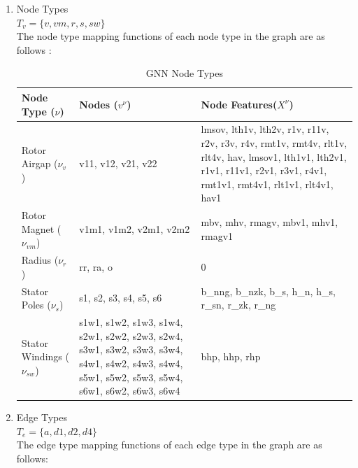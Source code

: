 \documentclass{report} %
\begin{document}
\begin{enumerate}
    \item Node Types \\
    \( T_v = \{ v, vm, r, s, sw\} \) \\
    The node type mapping functions of each node type in the graph are as follows :

    \begin{table}[H]
        \centering
        \begin{tabular}{|p{}|p{}|p{}|}
        \hline 
        {\bf Node Type (\(\nu\))} & {\bf Nodes (\( v^{\nu} \))} & {\bf Node Features(\( X^{\nu}\))}  \\
        \hline
        Rotor Airgap (\( \nu_v \)) & v11, v12, v21, v22 &
        lmsov, lth1v, lth2v, r1v, r11v, r2v, r3v, r4v, rmt1v, rmt4v, rlt1v, rlt4v, hav, \newline
        lmsov1, lth1v1, lth2v1, r1v1, r11v1, r2v1, r3v1, r4v1, rmt1v1, rmt4v1, rlt1v1, rlt4v1, hav1 \\
        \hline
        Rotor Magnet (\( \nu_{vm} \)) & 
        v1m1, v1m2, v2m1, v2m2 & 
        mbv, mhv, rmagv, mbv1, mhv1, rmagv1 \\
        \hline
        Radius (\( \nu_r \)) & 
        rr, ra, o & 0 \\
        \hline
        Stator Poles (\( \nu_s \)) & 
        s1, s2, s3, s4, s5, s6 & 
        b\_nng, b\_nzk, b\_s, h\_n, h\_s, r\_sn, r\_zk, r\_ng \\
        \hline
        Stator Windings (\( \nu_{sw} \)) & 
        s1w1, s1w2, s1w3, s1w4, \newline
        s2w1, s2w2, s2w3, s2w4, \newline
        s3w1, s3w2, s3w3, s3w4, \newline
        s4w1, s4w2, s4w3, s4w4, \newline
        s5w1, s5w2, s5w3, s5w4, \newline
        s6w1, s6w2, s6w3, s6w4 & 
        bhp, hhp, rhp \\
        \hline
        \end{tabular}
        \caption{\ac{GNN} Node Types}
        \label{tab:GNN Node Types}
    \end{table}

    \item Edge Types \\
    \( T_e = \{ a, d1, d2, d4\} \)\\
    The edge type mapping functions of each edge type in the graph are as follows: \\


\end{enumerate}
\end{document}
